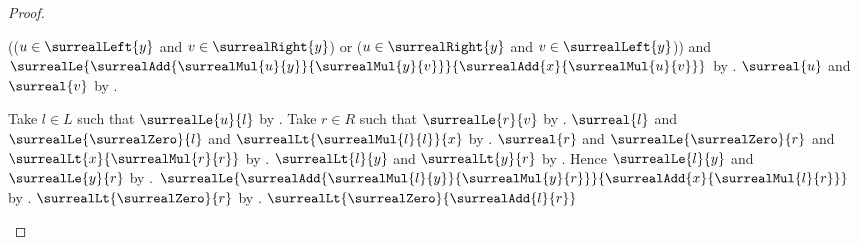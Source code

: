 \begin{proof}
\begin{subproof}
\begin{byCase}
\begin{byCase}
                        (($u\in\surrealLeft{y}$ and
                            $v\in\surrealRight{y}$) or
                         ($u\in\surrealRight{y}$ and
                            $v\in\surrealLeft{y}$)) and
                        $\surrealLe{
                            \surrealAdd{\surrealMul{u}{y}}{
                                \surrealMul{y}{v}}}{
                            \surrealAdd{x}{\surrealMul{u}{v}}}$
                        by .
                    $\surreal{u}$ and $\surreal{v}$
                        by
                        .
                    \begin{byCase}
                            Take $l\in L$ such that
                                $\surrealLe{u}{l}$
                                by .
                            Take $r\in R$ such that
                                $\surrealLe{r}{v}$
                                by .
                            $\surreal{l}$ and
                                $\surrealLe{\surrealZero}{l}$ and
                                $\surrealLt{\surrealMul{l}{l}}{x}$
                                by \auto.
                            $\surreal{r}$ and
                                $\surrealLe{\surrealZero}{r}$ and
                                $\surrealLt{x}{\surrealMul{r}{r}}$
                                by \auto.
                            $\surrealLt{l}{y}$ and
                                $\surrealLt{y}{r}$
                                by
                                .
                            Hence $\surrealLe{l}{y}$ and
                                $\surrealLe{y}{r}$
                                by .
                            $\surrealLe{
                                \surrealAdd{\surrealMul{l}{y}}{
                                    \surrealMul{y}{r}}}{
                                \surrealAdd{x}{\surrealMul{l}{r}}}$
                                by
                                .
                            $\surrealLt{\surrealZero}{r}$
                                by
                                .
                            $\surrealLt{\surrealZero}{
                                \surrealAdd{l}{r}}$

\end{byCase}
\end{byCase}
\end{byCase}
\end{subproof}
\end{proof}

